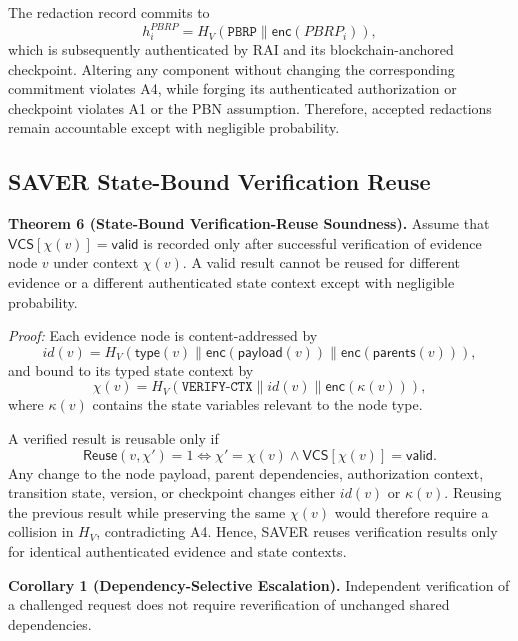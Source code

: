 \documentclass[lettersize,journal]{IEEEtran}
\begin{document}
The redaction record commits to
\begin{equation}
h_i^{PBRP}
=
H_V(\texttt{PBRP}\parallel\mathsf{enc}(PBRP_i)),
\end{equation}
which is subsequently authenticated by RAI and its blockchain-anchored
checkpoint. Altering any component without changing the corresponding
commitment violates A4, while forging its authenticated authorization
or checkpoint violates A1 or the PBN assumption. Therefore, accepted
redactions remain accountable except with negligible probability.


\subsection{SAVER State-Bound Verification Reuse}

\textbf{Theorem 6 (State-Bound Verification-Reuse Soundness).}
Assume that $\mathsf{VCS}[\chi(v)]=\mathsf{valid}$ is recorded only
after successful verification of evidence node $v$ under context
$\chi(v)$. A valid result cannot be reused for different evidence or a
different authenticated state context except with negligible
probability.

\emph{Proof:}
Each evidence node is content-addressed by
\begin{equation}
id(v)=
H_V(\mathsf{type}(v)\parallel
\mathsf{enc}(\mathsf{payload}(v))\parallel
\mathsf{enc}(\mathsf{parents}(v))),
\end{equation}
and bound to its typed state context by
\begin{equation}
\chi(v)=
H_V(\texttt{VERIFY-CTX}\parallel
id(v)\parallel\mathsf{enc}(\kappa(v))),
\label{eq:sec_saver_ctx}
\end{equation}
where $\kappa(v)$ contains the state variables relevant to the node
type.

A verified result is reusable only if
\begin{equation}
\mathsf{Reuse}(v,\chi')=1
\Longleftrightarrow
\chi'=\chi(v)
\land
\mathsf{VCS}[\chi(v)]=\mathsf{valid}.
\label{eq:sec_reuse}
\end{equation}
Any change to the node payload, parent dependencies, authorization
context, transition state, version, or checkpoint changes either
$id(v)$ or $\kappa(v)$. Reusing the previous result while preserving
the same $\chi(v)$ would therefore require a collision in $H_V$,
contradicting A4. Hence, SAVER reuses verification results only for
identical authenticated evidence and state contexts.

\medskip
\noindent\textbf{Corollary 1 (Dependency-Selective Escalation).}
Independent verification of a challenged request does not require
reverification of unchanged shared dependencies.
\end{document}
